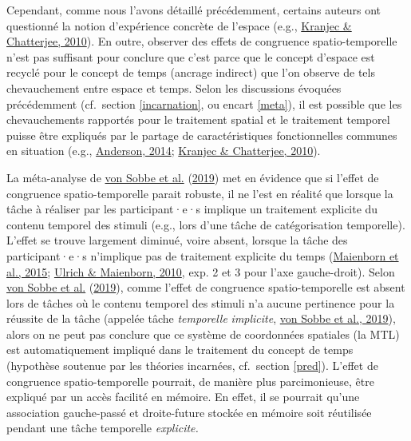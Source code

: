 \documentclass[
  a4paper,12pt,twoside,onecolumn,openright,final,oldfontcommands]{memoir}
\begin{document}
Cependant, comme nous l'avons détaillé précédemment, certains auteurs ont questionné la notion d'expérience concrète de l'espace (e.g., \protect\hyperlink{ref-kranjec_are_2010}{Kranjec \& Chatterjee, 2010}). En outre, observer des effets de congruence spatio-temporelle n'est pas suffisant pour conclure que c'est parce que le concept d'espace est recyclé pour le concept de temps (ancrage indirect) que l'on observe de tels chevauchement entre espace et temps. Selon les discussions évoquées précédemment (cf.~section \ref{incarnation}, ou encart \ref{meta}), il est possible que les chevauchements rapportés pour le traitement spatial et le traitement temporel puisse être expliqués par le partage de caractéristiques fonctionnelles communes en situation (e.g., \protect\hyperlink{ref-anderson_after_2014}{Anderson, 2014}; \protect\hyperlink{ref-kranjec_are_2010}{Kranjec \& Chatterjee, 2010}).

La méta-analyse de \protect\hyperlink{ref-von_sobbe_space-time_2019}{von Sobbe et al.} (\protect\hyperlink{ref-von_sobbe_space-time_2019}{2019}) met en évidence que si l'effet de congruence spatio-temporelle parait robuste, il ne l'est en réalité que lorsque la tâche à réaliser par les participant·e·s implique un traitement explicite du contenu temporel des stimuli (e.g., lors d'une tâche de catégorisation temporelle). L'effet se trouve largement diminué, voire absent, lorsque la tâche des participant·e·s n'implique pas de traitement explicite du temps (\protect\hyperlink{ref-maienborn_we_2015}{Maienborn et al., 2015}; \protect\hyperlink{ref-ulrich_leftright_2010}{Ulrich \& Maienborn, 2010}, exp. 2 et 3 pour l'axe gauche-droit). Selon \protect\hyperlink{ref-von_sobbe_space-time_2019}{von Sobbe et al.} (\protect\hyperlink{ref-von_sobbe_space-time_2019}{2019}), comme l'effet de congruence spatio-temporelle est absent lors de tâches où le contenu temporel des stimuli n'a aucune pertinence pour la réussite de la tâche (appelée tâche \emph{temporelle} \emph{implicite}, \protect\hyperlink{ref-von_sobbe_space-time_2019}{von Sobbe et al., 2019}), alors on ne peut pas conclure que ce système de coordonnées spatiales (la MTL) est automatiquement impliqué dans le traitement du concept de temps (hypothèse soutenue par les théories incarnées, cf.~section \ref{pred}). L'effet de congruence spatio-temporelle pourrait, de manière plus parcimonieuse, être expliqué par un accès facilité en mémoire. En effet, il se pourrait qu'une association gauche-passé et droite-future stockée en mémoire soit réutilisée pendant une tâche temporelle \emph{explicite.}
\end{document}
